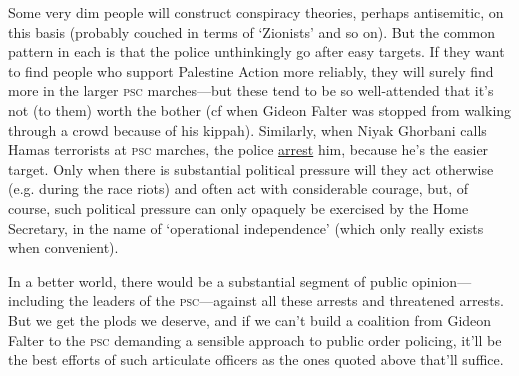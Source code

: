Some very dim people will construct conspiracy theories, perhaps antisemitic, on this basis (probably couched in terms of ‘Zionists’ and so on). But the common pattern in each is that the police unthinkingly go after easy targets. If they want to find people who support Palestine Action more reliably, they will surely find more in the larger \textsc{psc} marches—but these tend to be so well-attended that it’s not (to them) worth the bother (cf when Gideon Falter was stopped from walking through a crowd because of his kippah). Similarly, when Niyak Ghorbani calls Hamas terrorists at \textsc{psc} marches, the police \href{https://www.standard.co.uk/news/london/metropolitan-police-hamas-is-terrorist-placard-b1144341.html}{arrest} him, because he’s the easier target. Only when there is substantial political pressure will they act otherwise (e.g. during the race riots) and often act with considerable courage, but, of course, such political pressure can only opaquely be exercised by the Home Secretary, in the name of ‘operational independence’ (which only really exists when convenient).

In a better world, there would be a substantial segment of public opinion—including the leaders of the \textsc{psc}—against all these arrests and threatened arrests. But we get the plods we deserve, and if we can’t build a coalition from Gideon Falter to the \textsc{psc} demanding a sensible approach to public order policing, it’ll be the best efforts of such articulate officers as the ones quoted above that’ll suffice.